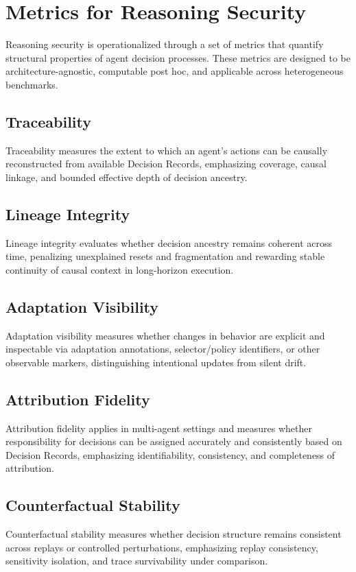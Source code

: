 \documentclass[11pt]{article}
\begin{document}
\section{Metrics for Reasoning Security}
Reasoning security is operationalized through a set of metrics that quantify structural properties of agent decision processes. These metrics are designed to be architecture-agnostic, computable post hoc, and applicable across heterogeneous benchmarks.

\subsection{Traceability}
Traceability measures the extent to which an agent’s actions can be causally reconstructed from available Decision Records, emphasizing coverage, causal linkage, and bounded effective depth of decision ancestry.

\subsection{Lineage Integrity}
Lineage integrity evaluates whether decision ancestry remains coherent across time, penalizing unexplained resets and fragmentation and rewarding stable continuity of causal context in long-horizon execution.

\subsection{Adaptation Visibility}
Adaptation visibility measures whether changes in behavior are explicit and inspectable via adaptation annotations, selector/policy identifiers, or other observable markers, distinguishing intentional updates from silent drift.

\subsection{Attribution Fidelity}
Attribution fidelity applies in multi-agent settings and measures whether responsibility for decisions can be assigned accurately and consistently based on Decision Records, emphasizing identifiability, consistency, and completeness of attribution.

\subsection{Counterfactual Stability}
Counterfactual stability measures whether decision structure remains consistent across replays or controlled perturbations, emphasizing replay consistency, sensitivity isolation, and trace survivability under comparison.
\end{document}
